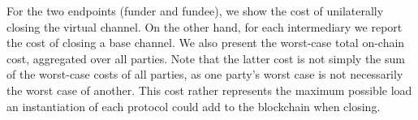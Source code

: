   For the two endpoints (funder and fundee), we show the cost of unilaterally
  closing the virtual channel. On the other hand, for each intermediary we
  report the cost of closing a base channel. We also present the worst-case
  total on-chain cost,
  aggregated over all parties. Note that the latter cost is not simply the sum
  of the worst-case costs of all parties, as one party's worst case is not
  necessarily the worst case of another. This cost rather represents the maximum
  possible load an instantiation of each protocol could add to the blockchain
  when closing.

  \addtolength{\intextsep}{-21pt}
  \begin{table}[h!]
\end{table}
